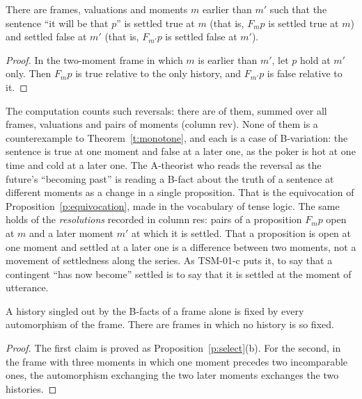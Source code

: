 \documentclass{situationist-preprint}
\begin{document}
\begin{proposition}\label{p:reversal}
There are frames, valuations and moments $m$ earlier than $m'$ such that the sentence \enquote{it will be that $p$} is settled true at $m$ (that is, $F_m p$ is settled true at $m$) and settled false at $m'$ (that is, $F_{m'} p$ is settled false at $m'$).
\end{proposition}

\begin{proof}
In the two-moment frame in which $m$ is earlier than $m'$, let $p$ hold at $m'$ only. Then $F_m p$ is true relative to the only history, and $F_{m'} p$ is false relative to it.
\end{proof}

The computation counts such reversals: there are \NReversals{} of them, summed over all frames, valuations and pairs of moments (column rev). None of them is a counterexample to Theorem~\ref{t:monotone}, and each is a case of B-variation: the sentence is true at one moment and false at a later one, as the poker is hot at one time and cold at a later one. The A-theorist who reads the reversal as the future's \enquote{becoming past} is reading a B-fact about the truth of a sentence at different moments as a change in a single proposition. That is the equivocation of Proposition~\ref{p:equivocation}, made in the vocabulary of tense logic. The same holds of the \NResolutions{} \emph{resolutions} recorded in column res: pairs of a proposition $F_m p$ open at $m$ and a later moment $m'$ at which it is settled. That a proposition is open at one moment and settled at a later one is a difference between two moments, not a movement of settledness along the series. As TSM-01-c puts it, to say that a contingent \enquote{has now become} settled is to say that it is settled at the moment of utterance.

\begin{proposition}\label{p:trl}
A history singled out by the B-facts of a frame alone is fixed by every automorphism of the frame. There are frames in which no history is so fixed.
\end{proposition}

\begin{proof}
The first claim is proved as Proposition~\ref{p:select}(b). For the second, in the frame with three moments in which one moment precedes two incomparable ones, the automorphism exchanging the two later moments exchanges the two histories.
\end{proof}
\end{document}
